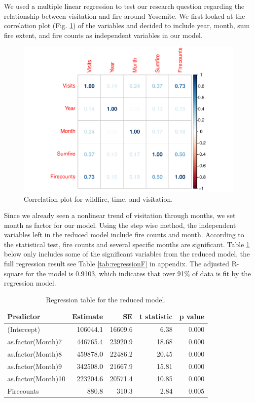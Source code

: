 \documentclass[
  12pt,
]{article}
\begin{document}
We used a multiple linear regression to test our research question regarding the relationship between visitation and fire around Yosemite. We first looked at the correlation plot (Fig. \ref{fig:corrplot}) of the variables and decided to include year, month, sum fire extent, and fire counts as independent variables in our model.

\begin{figure}
\centering
\includegraphics{CodeFinal_files/figure-latex/corrplot-1.pdf}
\caption{\label{fig:corrplot}Correlation plot for wildfire, time, and visitation.}
\end{figure}

Since we already seen a nonlinear trend of visitation through months, we set month as factor for our model. Using the step wise method, the independent variables left in the reduced model include fire counts and month. According to the statistical test, fire counts and several specific months are significant.
Table \ref{tab:regression} below only includes some of the significant variables from the reduced model, the full regression result see Table \ref{tab:regressionF} in appendix. The adjusted R-square for the model is 0.9103, which indicates that over 91\% of data is fit by the regression model.

\begin{table}

\caption{\label{tab:regression}Regression table for the reduced model. }
\centering
\begin{tabular}[t]{l|r|r|r|r}
\hline
Predictor & Estimate & SE & t statistic & p value\\
\hline
(Intercept) & 106044.1 & 16609.6 & 6.38 & 0.000\\
\hline
as.factor(Month)7 & 446765.4 & 23920.9 & 18.68 & 0.000\\
\hline
as.factor(Month)8 & 459878.0 & 22486.2 & 20.45 & 0.000\\
\hline
as.factor(Month)9 & 342508.0 & 21667.9 & 15.81 & 0.000\\
\hline
as.factor(Month)10 & 223204.6 & 20571.4 & 10.85 & 0.000\\
\hline
Firecounts & 880.8 & 310.3 & 2.84 & 0.005\\
\hline
\end{tabular}
\end{table}
\end{document}
